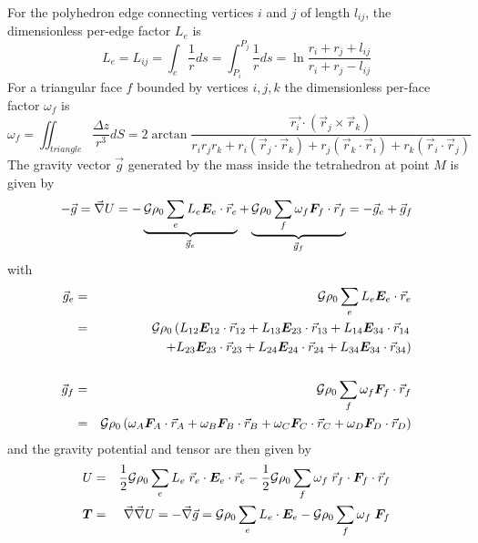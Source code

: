 For the polyhedron edge connecting
vertices $i$ and $j$ of length $l_{ij}$, the dimensionless per-edge factor $L_e$ is
\[
L_e=L_{ij} = \int_e \frac{1}{r}ds = \int_{P_i}^{P_j} \frac{1}{r} ds 
= \ln \frac{r_i+r_j+l_{ij}}{r_i+r_j-l_{ij}}
\]
For a triangular face $f$ bounded by vertices $i,j,k$ the dimensionless
per-face factor $\omega_f$ is 
\[
\omega_f = 
\iint_{triangle} \frac{\Delta z}{r^3} dS 
= 2 \arctan \frac{\vec{r_i} \cdot (\vec{r}_j \times \vec{r}_k)}{r_ir_jr_k 
+r_i(\vec{r}_j\cdot\vec{r}_k) 
+r_j(\vec{r}_k\cdot\vec{r}_i) 
+r_k(\vec{r}_i\cdot\vec{r}_j) 
}
\]
The gravity vector $\vec{g}$ generated by the mass inside the tetrahedron 
at point $M$ is given by
\[
-\vec{g} = \vec\nabla U = 
- \underbrace{{\cal G} \rho_0 \sum_e L_e {\bm E}_e\cdot\vec{r}_e}_{\vec{g}_e}
+
\underbrace{{\cal G} \rho_0 \sum_f \omega_f {\bm F}_f\cdot \vec{r}_f}_{\vec{g}_f}
= -\vec{g}_e + \vec{g}_f
\]
with
\begin{eqnarray}
\vec{g}_e 
&=& {\cal G} \rho_0 \sum_e L_e {\bm E}_e \cdot \vec{r}_e \nonumber\\
&=& {\cal G} \rho_0 \left(
L_{12} {\bm E}_{12}\cdot\vec{r}_{12} +
L_{13} {\bm E}_{23}\cdot\vec{r}_{13} +
L_{14} {\bm E}_{34}\cdot\vec{r}_{14} \right. \nonumber\\
&& \left. + 
L_{23} {\bm E}_{23}\cdot\vec{r}_{23} + 
L_{24} {\bm E}_{24}\cdot\vec{r}_{24} +
L_{34} {\bm E}_{34}\cdot\vec{r}_{34} 
\right) \label{eq:tetra:ge}\\ \nonumber\\
\vec{g}_f
&=& {\cal G} \rho_0 \sum_f \omega_f {\bm F}_f\cdot \vec{r}_f \nonumber\\
&=& {\cal G} \rho_0 \left(
\omega_A {\bm F}_A\cdot \vec{r}_A +
\omega_B {\bm F}_B\cdot \vec{r}_B +
\omega_C {\bm F}_C\cdot \vec{r}_C +
\omega_D {\bm F}_D\cdot \vec{r}_D  
\right) \label{eq:tetra:gf}
\end{eqnarray}
and the gravity potential and tensor are then given by
\begin{eqnarray}
U &=& \frac12 {\cal G} \rho_0  \sum_e  L_e \; \vec{r}_e\cdot{\bm E}_e \cdot \vec{r}_e 
-\frac12 {\cal G} \rho_0 \sum_f \omega_f \; \vec{r}_f \cdot{\bm F}_f \cdot \vec{r}_f  \\
{\bm T} &=&
\vec\nabla\vec\nabla U = -\vec\nabla \vec{g} =
{\cal G} \rho_0 \sum_e 
L_e \cdot{\bm E}_e 
- {\cal G} \rho_0 \sum_f \omega_f \; {\bm F}_f 
\end{eqnarray}



